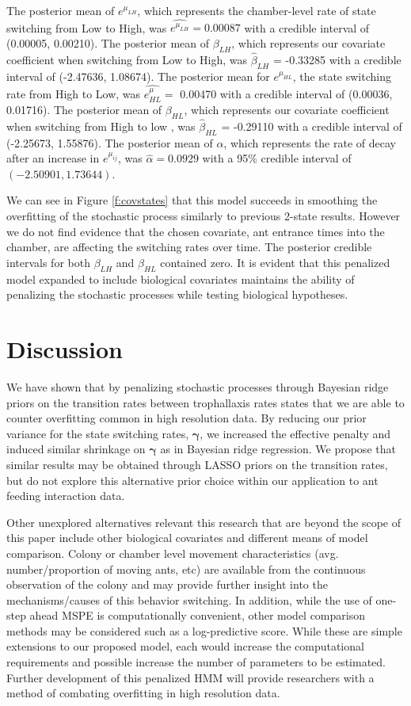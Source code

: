 \documentclass[smallextended]{svjour3}       %
\begin{document}
The posterior mean of $e^{\mu_{LH}}$, which represents the chamber-level rate of state switching from Low to High, was $\hat{e^{\mu_{LH}}} = 0.00087$  with a credible interval of (0.00005, 0.00210). The posterior mean of $\beta_{LH}$, which represents our covariate coefficient when switching from Low to High, was $\hat{\beta}_{LH}$ = -0.33285 with a credible interval of (-2.47636, 1.08674). The posterior mean for $e^{\mu_{HL}}$, the state switching rate from High to Low, was $\hat{e^\mu_{HL}} = $ 0.00470 with a credible interval of (0.00036,	0.01716). The posterior mean of $\beta_{HL}$, which represents our covariate coefficient when switching from High to low , was $\hat{\beta}_{HL}$ = -0.29110 with a credible interval of (-2.25673, 1.55876). The posterior mean of $\alpha$, which represents the rate of decay after an increase in $e^{\mu_{ij}}$, was $\hat{\alpha} = 0.0929$ with a 95\% credible interval of $(-2.50901, 1.73644)$. 

We can see in Figure \ref{f:covstates} that  this model succeeds in smoothing the overfitting of the stochastic process similarly to previous 2-state results. However we do not find evidence that the chosen covariate, ant entrance times into the chamber, are affecting the switching rates over time. The posterior credible intervals for both $\beta_{LH}$ and $\beta_{HL}$ contained zero. It is evident that this penalized model expanded to include biological covariates maintains the ability of penalizing the stochastic processes while testing biological hypotheses.
% 
\section{Discussion}
\label{s:discuss}
% 
We have shown that by penalizing stochastic processes through Bayesian ridge priors on the transition rates between trophallaxis rates states that we are able to counter overfitting common in high resolution data. By reducing our prior variance for the state switching rates, $\bm{\gamma}$, we increased the effective penalty and induced similar shrinkage on $\bm{\gamma}$ as in Bayesian ridge regression. We propose that similar results may be obtained through LASSO priors on the transition rates, but do not explore this alternative prior choice within our application to ant feeding interaction data. 

Other unexplored alternatives relevant this research that are beyond the scope of this paper include other biological covariates and different means of model comparison.  Colony or chamber level movement characteristics (avg. number/proportion of moving ants, etc) are available from the continuous observation of the colony and may provide further insight into the mechanisms/causes of this behavior switching. In addition, while the use of one-step ahead MSPE is computationally convenient, other model comparison methods may be considered such as a log-predictive score. While these are simple extensions to our proposed model, each would increase the computational requirements and possible increase the number of parameters to be estimated. Further development of this penalized HMM will provide researchers with a method of combating overfitting in high resolution data.      
\end{document}
